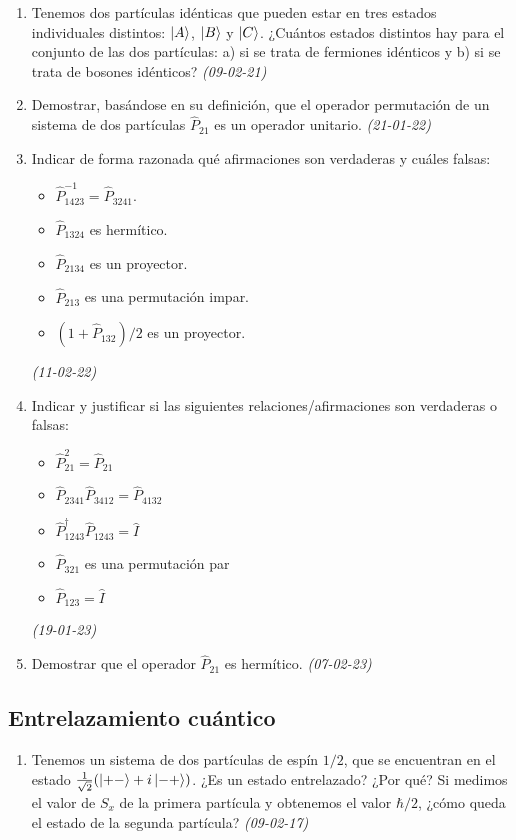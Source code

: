\begin{enumerate}
    \item Tenemos dos partículas idénticas que pueden estar en tres estados individuales distintos: $\ket{A}$, $\ket{B}$ y $\ket{C}$. ¿Cuántos estados distintos hay para el conjunto de las dos partículas: a) si se trata de fermiones idénticos y b) si se trata de bosones idénticos? \textit{(09-02-21)}

    \item Demostrar, basándose en su definición, que el operador permutación de un sistema de dos partículas $\hat{P}_{21}$ es un operador unitario. \textit{(21-01-22)}

    \item Indicar de forma razonada qué afirmaciones son verdaderas y cuáles falsas:
    \begin{itemize}
        \item $\hat{P}_{1423}^{-1} = \hat{P}_{3241}$.
        \item $\hat{P}_{1324}$ es hermítico.
        \item $\hat{P}_{2134}$ es un proyector.
        \item $\hat{P}_{213}$ es una permutación impar.
        \item $(1 + \hat{P}_{132}) / 2$ es un proyector.
    \end{itemize}
    \textit{(11-02-22)}

    \item Indicar y justificar si las siguientes relaciones/afirmaciones son verdaderas o falsas:
    \begin{itemize}
        \item $\hat{P}_{21}^2 = \hat{P}_{21}$
        \item $\hat{P}_{2341} \hat{P}_{3412} = \hat{P}_{4132}$
        \item $\hat{P}_{1243}^\dagger \hat{P}_{1243} = \hat{I}$
        \item $\hat{P}_{321}$ es una permutación par
        \item $\hat{P}_{123} = \hat{I}$
    \end{itemize}
    \textit{(19-01-23)}

    \item Demostrar que el operador $\hat{P}_{21}$ es hermítico. \textit{(07-02-23)}

\end{enumerate}


\subsection*{Entrelazamiento cuántico}

\begin{enumerate}
    
    \item Tenemos un sistema de dos partículas de espín $1/2$, que se encuentran en el estado $\frac{1}{\sqrt{2}} (\ket{+-} + i \ket{-+})$. ¿Es un estado entrelazado? ¿Por qué? Si medimos el valor de $S_x$ de la primera partícula y obtenemos el valor $\hbar/2$, ¿cómo queda el estado de la segunda partícula? \textit{(09-02-17)}

\end{enumerate}
